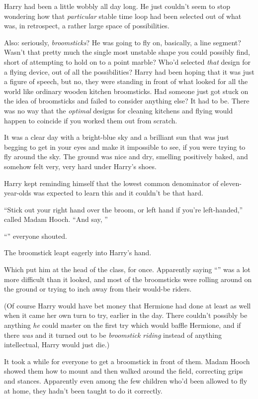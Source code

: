 Harry had been a little wobbly all day long. He just couldn’t seem to stop wondering how that \emph{particular} stable time loop had been selected out of what was, in retrospect, a rather large space of possibilities.

Also: seriously, \emph{broomsticks}? He was going to fly on, basically, a line segment? Wasn’t that pretty much the single most unstable shape you could possibly find, short of attempting to hold on to a point marble? Who’d selected \emph{that} design for a flying device, out of all the possibilities? Harry had been hoping that it was just a figure of speech, but no, they were standing in front of what looked for all the world like ordinary wooden kitchen broomsticks. Had someone just got stuck on the idea of broomsticks and failed to consider anything else? It had to be. There was no way that the \emph{optimal} designs for cleaning kitchens and flying would happen to coincide if you worked them out from scratch.

It was a clear day with a bright-blue sky and a brilliant sun that was just begging to get in your eyes and make it impossible to see, if you were trying to fly around the sky. The ground was nice and dry, smelling positively baked, and somehow felt very, very hard under Harry’s shoes.

Harry kept reminding himself that the lowest common denominator of eleven-year-olds was expected to learn this and it couldn’t be that hard.

“Stick out your right hand over the broom, or left hand if you’re left-handed,” called Madam Hooch.
“And say, ”

“” everyone shouted.

The broomstick leapt eagerly into Harry’s hand.

Which put him at the head of the class, for once. Apparently saying “” was a lot more difficult than it looked, and most of the broomsticks were rolling around on the ground or trying to inch away from their would-be riders.

(Of course Harry would have bet money that Hermione had done at least as well when it came her own turn to try, earlier in the day. There couldn’t possibly be anything \emph{he} could master on the first try which would baffle Hermione, and if there \emph{was} and it turned out to be \emph{broomstick riding} instead of anything intellectual, Harry would just die.)

It took a while for everyone to get a broomstick in front of them. Madam Hooch showed them how to mount and then walked around the field, correcting grips and stances. Apparently even among the few children who’d been allowed to fly at home, they hadn’t been taught to do it correctly.

